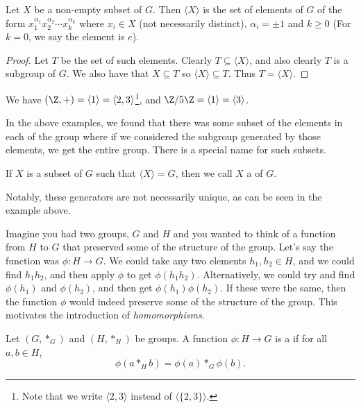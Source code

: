 \begin{proposition}
	Let $X$ be a non-empty subset of $G$. Then $\langle X \rangle$ is the set of elements of $G$ of the form 
	$x_1^{\alpha_1} x_2^{\alpha_2} \cdots x_k^{\alpha_k}$ where $x_i \in X$ (not necessarily distinct), $\alpha_i = \pm 1$ and $k \geq 0$
	(For $k = 0$, we say the element is $e$).
\end{proposition}
\begin{proof}
	Let $T$ be the set of such elements. Clearly $T \subseteq \langle X \rangle$, and also clearly $T$ is a subgroup of $G$. We also have that $X \subseteq T$ so $\langle X \rangle \subseteq T$. Thus $T = \langle X \rangle$.
\end{proof}
  
\begin{example}
	We have $(\Z, +) = \langle 1 \rangle = \langle 2, 3 \rangle$\footnote{Note that we write $\langle 2, 3\rangle$ instead of $\langle \{2, 3\} \rangle$.}, and $\Z/5\Z = \langle 1 \rangle = \langle 3 \rangle$.
\end{example}

In the above examples, we found that there was some subset of the elements in each of the group where if we considered the subgroup generated by those elements, we get the entire group.
There is a special name for such subsets.

\begin{definition}[Generators]\label{def:generator}
	If $X$ is a subset of $G$ such that $\langle X \rangle = G$, then we call $X$ a  of $G$.
\end{definition}

Notably, these generators are not necessarily unique, as can be seen in the example above.



Imagine you had two groups, $G$ and $H$ and you wanted to think of a function from $H$ to $G$ that preserved some of the structure of the group.
Let's say the function was $\phi : H \rightarrow G$. We could take any two elements $h_1, h_2 \in H$, and we could find $h_1 h_2$, and then apply $\phi$ to get $\phi(h_1 h_2)$.
Alternatively, we could try and find $\phi(h_1)$ and $\phi(h_2)$, and then get $\phi(h_1) \phi(h_2)$. If these were the same, then the function $\phi$ would indeed preserve some of the structure of the group. This motivates the introduction of \emph{homomorphisms}.

\begin{definition}[Homomorphism]
	Let $(G, *_G)$ and $(H, *_H)$ be groups. A function $\phi : H \rightarrow G$ is a  if for all $a, b \in H$,
	$$
	\phi(a *_H b) = \phi(a) *_G \phi(b).
	$$
\end{definition}

